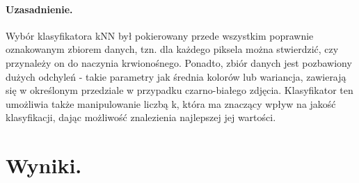\documentclass[a4paper, 11pt]{article}
\begin{document}
\paragraph{Uzasadnienie.}

Wybór klasyfikatora kNN był pokierowany przede wszystkim poprawnie oznakowanym zbiorem danych, tzn. dla każdego piksela można stwierdzić, czy przynależy on do naczynia krwionośnego.
Ponadto, zbiór danych jest pozbawiony dużych odchyleń - takie parametry jak średnia kolorów lub wariancja, zawierają się w określonym przedziale w przypadku czarno-białego zdjęcia. Klasyfikator ten umożliwia także manipulowanie liczbą k, która ma znaczący wpływ na jakość klasyfikacji, dając możliwość znalezienia najlepszej jej wartości.

\newpage


\section{Wyniki.}
\end{document}
